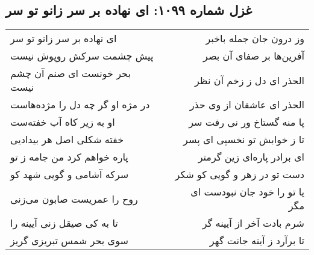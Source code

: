 \begin{center}
\section*{غزل شماره ۱۰۹۹: ای نهاده بر سر زانو تو سر}
\label{sec:1099}
\begin{longtable}{l p{0.5cm} r}
ای نهاده بر سر زانو تو سر
&&
وز درون جان جمله باخبر
\\
پیش چشمت سرکش روپوش نیست
&&
آفرین‌ها بر صفای آن بصر
\\
بحر خونست ای صنم آن چشم نیست
&&
الحذر ای دل ز زخم آن نظر
\\
در مژه او گر چه دل را مژده‌هاست
&&
الحذر ای عاشقان از وی حذر
\\
او به زیر کاه آب خفته‌ست
&&
پا منه گستاخ ور نی رفت سر
\\
خفته شکلی اصل هر بیدادیی
&&
تا ز خوابش تو نخسپی ای پسر
\\
پاره خواهم کرد من جامه ز تو
&&
ای برادر پاره‌ای زین گرمتر
\\
سرکه آشامی و گویی شهد کو
&&
دست تو در زهر و گویی کو شکر
\\
روح را عمریست صابون می‌زنی
&&
یا تو را خود جان نبودست ای مگر
\\
تا به کی صیقل زنی آیینه را
&&
شرم بادت آخر از آیینه گر
\\
سوی بحر شمس تبریزی گریز
&&
تا برآرد ز آینه جانت گهر
\\
\end{longtable}
\end{center}
